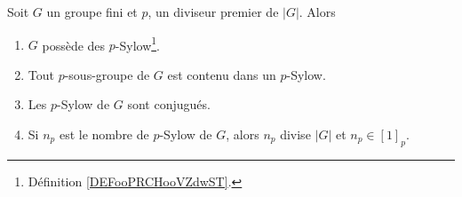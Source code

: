 \begin{theorem}  \label{ThoUkPDXf}
    Soit \( G\) un groupe fini et \( p\), un diviseur premier de \( | G |\). Alors
    \begin{enumerate}
        \item       \label{ITEMooETYHooXlUMQZ}
            \( G\) possède des \( p\)-Sylow\footnote{Définition \ref{DEFooPRCHooVZdwST}.}.
        \item
            Tout \( p\)-sous-groupe de \( G\) est contenu dans un \( p\)-Sylow.
        \item   \label{ItemMzNRVf}
            Les \( p\)-Sylow de \( G\) sont conjugués.
        \item   \label{ItemkYbdzZ}
            Si \( n_p\) est le nombre de $p$-Sylow de \( G\), alors \( n_p\) divise \( | G |\) et \( n_p\in[1]_p\).
    \end{enumerate}
\end{theorem}

